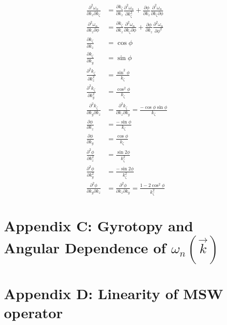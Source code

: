 \documentclass{article}
\begin{document}
\begin{align}
\frac{\partial^2 \omega_{n}}{\partial k_{z} \partial k_{\zeta}} &= \frac{\partial k_{\zeta}}{\partial k_{z}} \frac{\partial^2 \omega_{n}}{\partial k_{\zeta}^2} + \frac{\partial \phi}{\partial k_{z}} \frac{\partial^2 \omega_{n}}{\partial k_{\zeta} \partial \phi} \\
\frac{\partial^2 \omega_{n}}{\partial k_{z} \partial \phi} &= \frac{\partial k_{\zeta}}{\partial k_{z}} \frac{\partial^2 \omega_{n}}{\partial k_{\zeta} \partial \phi} + \frac{\partial \phi}{\partial k_{z}} \frac{\partial^2 \omega_{n}}{\partial \phi^2} \\
\frac{\partial k_{\zeta}}{\partial k_{z}} &= \cos{\phi} \\
\frac{\partial k_{\zeta}}{\partial k_{y}} &= \sin{\phi} \\
\frac{\partial^2 k_{\zeta}}{\partial k_{z}^2} &= \frac{\sin^2{\phi}}{k_{\zeta}} \\
\frac{\partial^2 k_{\zeta}}{\partial k_{y}^2} &= \frac{\cos^2{\phi}}{k_{\zeta}} \\
\frac{\partial^2 k_{\zeta}}{\partial k_{y} \partial k_{z}} &= \frac{\partial^2 k_{\zeta}}{\partial k_{z} \partial k_{y}} = \frac{-\cos{\phi} \sin{\phi}}{k_{\zeta}} \\
\frac{\partial \phi}{\partial k_{z}} &= \frac{- \sin{\phi}}{k_{\zeta}} \\
\frac{\partial \phi}{\partial k_{y}} &= \frac{\cos{\phi}}{k_{\zeta}} \\
\frac{\partial^2 \phi}{\partial k_{z}^2} &= \frac{\sin{2 \phi}}{k_{\zeta}^2} \\
\frac{\partial^2 \phi}{\partial k_{y}^2} &= \frac{-\sin{2 \phi}}{k_{\zeta}^2} \\
\frac{\partial^2 \phi}{\partial k_{y} \partial k_{z}} &= \frac{\partial^2 \phi}{\partial k_{z} \partial k_{y}} = \frac{1 - 2\cos^2{\phi}}{k_{\zeta}^2}
\end{align}

\section{Appendix C: Gyrotopy and Angular Dependence of $\omega_{n} (\vec{k})$}

\section{Appendix D: Linearity of MSW operator}
\end{document}
